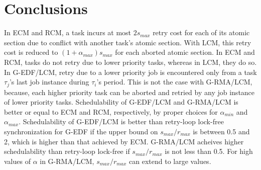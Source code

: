 \section{Conclusions}
\label{sec:conclusions_lcm}

In ECM and RCM, a task incurs at most $2s_{max}$ retry cost for each of its atomic section due to conflict
with another task's atomic section. With LCM, this retry cost is reduced to $(1+\alpha_{max})s_{max}$ for each aborted atomic section. In ECM and RCM, tasks do not retry due to lower priority tasks, whereas in LCM, they do so. In G-EDF/LCM, retry due to a lower priority job is encountered only from a task $\tau_{j}$'s last job instance 
during $\tau_{i}$'s period. This is not the case with G-RMA/LCM, because,  each higher priority task can be aborted and retried by any job instance of lower priority tasks. Schedulability of G-EDF/LCM and G-RMA/LCM is better or equal to ECM and RCM, respectively, by proper choices for $\alpha_{min}$ and $\alpha_{max}$. Schedulability of G-EDF/LCM is better than retry-loop lock-free synchronization for G-EDF if the upper bound on $s_{max}/r_{max}$ is between 0.5 and 2, which is higher than that achieved by ECM. 
G-RMA/LCM acheives higher schedulability than retry-loop lock-free if $s_{max}/r_{max}$ is not less than 0.5. For high values of $\alpha$ in G-RMA/LCM, $s_{max}/r_{max}$ can extend to large values.
